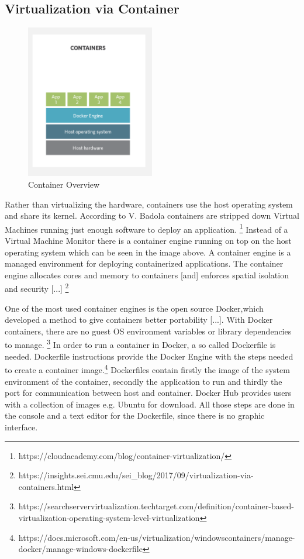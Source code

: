\documentclass[utf8,biblatex]{lni}
\begin{document}
\subsection{Virtualization via Container}

\begin{figure}
  \centering
  \includegraphics[width=0.5\textwidth]{Container.pdf}
  \caption{Container Overview}
  \label{img:container}
\end{figure}

Rather than virtualizing the hardware, containers use the host operating system and share its kernel. According to V. Badola containers are stripped down Virtual Machines running just enough software to deploy an application. \footnote{https://cloudacademy.com/blog/container-virtualization/} Instead of a Virtual Machine Monitor there is a container engine running on top on the host operating system which can be seen in the image above. \glqq A container engine is a managed environment for deploying containerized applications. The container engine allocates cores and memory to containers [and] enforces spatial isolation and security [...] \glqq \footnote{https://insights.sei.cmu.edu/sei_blog/2017/09/virtualization-via-containers.html} 

One of the most used container engines is the open source Docker,\glqq [...] which developed a method to give containers better portability [...]. With Docker containers, there are no guest OS environment variables or library dependencies to manage. \glqq \footnote{https://searchservervirtualization.techtarget.com/definition/container-based-virtualization-operating-system-level-virtualization} In order to run a container in Docker, a so called Dockerfile is needed. \glqq Dockerfile instructions provide the Docker Engine with the steps needed to create a container image.\glqq \footnote{https://docs.microsoft.com/en-us/virtualization/windowscontainers/manage-docker/manage-windows-dockerfile} Dockerfiles contain firstly the image of the system environment of the container, secondly the application to run and thirdly the port for communication between host and container. Docker Hub provides users with a collection of images e.g. Ubuntu for download. All those steps are done in the console and a text editor for the Dockerfile, since there is no graphic interface.
\end{document}
